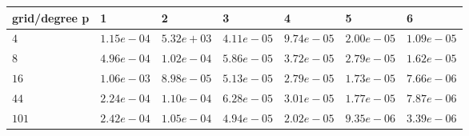 \begin{tabular}{lllllll}
\hline
 grid/degree p   & 1          & 2          & 3          & 4          & 5          & 6          \\
\hline
 $4$             & $1.15e-04$ & $5.32e+03$ & $4.11e-05$ & $9.74e-05$ & $2.00e-05$ & $1.09e-05$ \\
 $8$             & $4.96e-04$ & $1.02e-04$ & $5.86e-05$ & $3.72e-05$ & $2.79e-05$ & $1.62e-05$ \\
 $16$            & $1.06e-03$ & $8.98e-05$ & $5.13e-05$ & $2.79e-05$ & $1.73e-05$ & $7.66e-06$ \\
 $44$            & $2.24e-04$ & $1.10e-04$ & $6.28e-05$ & $3.01e-05$ & $1.77e-05$ & $7.87e-06$ \\
 $101$           & $2.42e-04$ & $1.05e-04$ & $4.94e-05$ & $2.02e-05$ & $9.35e-06$ & $3.39e-06$ \\
\hline
\end{tabular}